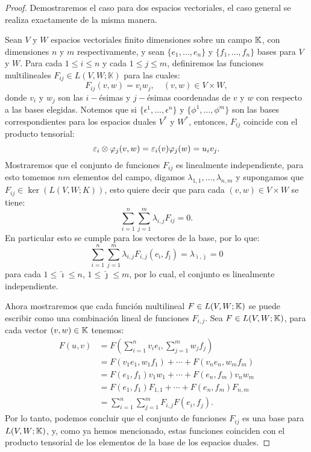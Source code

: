 \begin{proof}
	Demostraremos el caso para dos espacios vectoriales, el caso general se
	realiza exactamente de la misma manera.

	Sean $V$ y $W$ espacios vectoriales finito dimensiones sobre un campo
	$\mathbb{K}$, con dimensiones $n$ y $m$ respectivamente, y sean $\{e_1,
		\ldots, e_n\}$ y $\{f_1, \ldots, f_n\}$ bases para $V$ y $W$. Para cada
	$1 \leq i \leq n$ y cada $1 \leq j \leq m$, definiremos las funciones
	multilineales $F_{ij} \in L(V,W;\mathbb{K})$ para las cuales:
	\[
		F_{ij} (v,w) = v_i w_j, \quad (v,w) \in V \times W,
	\]
	donde $v_i$ y $w_j$ son las $i-$ésimas y $j-$ésimas coordenadas de $v$ y $w$
	con respecto a las bases elegidas. Notemos que si $\{\epsilon^{1}, \ldots,
		\epsilon^{n}\}$ y $\{\phi^{1}, \ldots, \phi^{m}\}$ son las bases
	correspondientes  para los espacios duales $V^{*}$ y $W^{*}$, entonces,
	$F_{ij}$ coincide con el producto tensorial:
	\[
		\varepsilon_{i} \otimes \varphi_{j} (v,w) = \varepsilon_{i}(v) \varphi_{j}(w)
		= u_{i}v_{j}.
	\]
	Mostraremos que el conjunto de funciones $F_{ij}$ es linealmente
	independiente, para esto tomemos $nm$ elementos del campo, digamos
	$\lambda_{1,1}, \ldots, \lambda_{n,m}$ y supongamos que $F_{ij} \in
		\ker\left(L(V,W;K)\right)$, esto quiere decir que para cada $(v,w) \in
		V \times W$ se tiene:
	\[
		\sum_{i=1}^{n}\sum_{j=1}^{m} \lambda_{i,j} F_{ij} = 0.
	\]
	En particular esto se cumple para los vectores de la base, por lo que:
	\[
		\sum_{i=1}^{n}\sum_{j=1}^{m}\lambda_{i,j}F_{i,j}(e_{\hat{\imath}}, f_{\hat{\jmath}})
		= \lambda_{\hat{\imath},\hat{\jmath}} = 0
	\]
	para cada $1 \leq \hat{\imath} \leq n$, $1 \leq \hat{\jmath} \leq m$, por lo cual, el
	conjunto es linealmente independiente.

	Ahora mostraremos que cada función multilineal $F \in L(V,W;\mathbb{K})$
	se puede escribir como una combinación lineal de funciones $F_{i,j}$. Sea
	$F \in L(V,W;\mathbb{K})$, para cada vector $(v,w) \in \mathbb{K}$ tenemos:
	\begin{align*}
		F(u,v) & = F\left(\sum_{i=1}^n v_i e_i,\sum_{j=1}^m w_j f_j \right) \\
		       & = F(v_1 e_1, w_1 f_1) + \cdots + F(v_n e_n, w_m f_m)       \\
		       & = F(e_1,f_1)v_1w_1 + \cdots + F(e_n,f_m) v_n w_m           \\
		       & = F(e_1,f_1)F_{1,1} + \cdots + F(e_n,f_m) F_{n,m}          \\
		       & = \sum_{i=1}^{n} \sum_{j=1}^{m} F_{i,j} F(e_i,f_j).
	\end{align*}
	Por lo tanto, podemos concluir que el conjunto de funciones $F_{ij}$ es
	una base para $L(V,W;\mathbb{K})$, y, como ya hemos mencionado, estas
	funciones coinciden con el producto tensorial de los elementos de la base
	de los espacios duales.
\end{proof}

